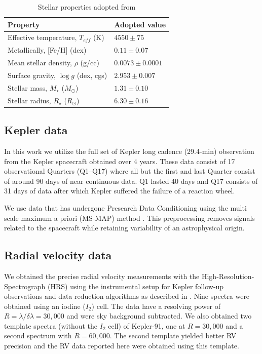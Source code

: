 \documentclass[apjl]{emulateapj}
\begin{document}
\begin{table}
\centering
\caption{Stellar properties adopted from \citet{lillo13}}\label{tab:stellar}
\begin{tabular}{l l }
Property & Adopted value \\
\hline
Effective temperature, $T_{eff}$ (K)		&	$4550\pm75$ \\
Metallically, [Fe/H] (dex)				& 	$0.11 \pm0.07$\\
Mean stellar density, $\rho$ (g/cc)		&	$0.0073 \pm0.0001$ \\
Surface gravity, $\log{g}$ (dex, cgs)		&	$2.953 \pm 0.007$ \\
Stellar mass, $M_\star$ ($M_\odot$)		&	$1.31 \pm 0.10$\\
Stellar radius, $R_\star$ ($R_\odot$)		&	$6.30 \pm 0.16$ \\
\hline
\end{tabular}
\end{table}


\subsection{Kepler data}
In this work we utilize the full set of Kepler long cadence (29.4-min) observation from the Kepler spacecraft obtained over 4 years. These data consist of 17 observational Quarters  (Q1--Q17) where all but the first and last Quarter consist of around 90 days of near continuous data. Q1 lasted 40 days and Q17 consists of  31 days of data after which Kepler suffered the failure of a reaction wheel. 

We use data that has undergone Presearch Data Conditioning \citep{stumpe12,smith12} using the multi scale maximum a priori (MS-MAP) method \citep{stumpe14}. This preprocessing removes signals related to the spacecraft while retaining variability of an astrophysical origin.

\subsection{Radial velocity data}
We obtained the precise radial velocity measurements with the High-Resolution-Spectrograph (HRS) \citep{tull98} using the
instrumental setup for Kepler follow-up observations and data reduction algorithms as described in \citet{endl11}. Nine spectra were obtained using an iodine ($I_2$) cell. The data have a resolving power of $R = \lambda/\delta\lambda = 30,000$ and were sky background subtracted. We also obtained two template spectra (without the $I_2$ cell) of Kepler-91, one at $R=30,000$ and a second spectrum with $R=60,000$. The second template yielded better RV precision and the RV data reported here were obtained using this template.
\end{document}

